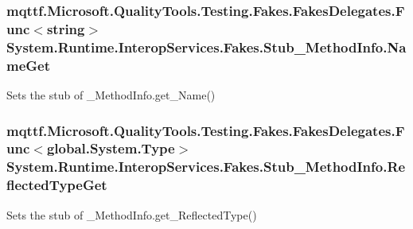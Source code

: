 \hypertarget{class_system_1_1_runtime_1_1_interop_services_1_1_fakes_1_1_stub___method_info_a2f80c227e0f981048a01eba08b0653f2}{
\subsubsection[{Name\-Get}]{\setlength{\rightskip}{0pt plus 5cm}mqttf.\-Microsoft.\-Quality\-Tools.\-Testing.\-Fakes.\-Fakes\-Delegates.\-Func$<$string$>$ System.\-Runtime.\-Interop\-Services.\-Fakes.\-Stub\-\_\-\-Method\-Info.\-Name\-Get}}\label{class_system_1_1_runtime_1_1_interop_services_1_1_fakes_1_1_stub___method_info_a2f80c227e0f981048a01eba08b0653f2}


Sets the stub of \-\_\-\-Method\-Info.\-get\-\_\-\-Name()

\hypertarget{class_system_1_1_runtime_1_1_interop_services_1_1_fakes_1_1_stub___method_info_aec8647cb4dccf19c4773077149a5662b}{
\subsubsection[{Reflected\-Type\-Get}]{\setlength{\rightskip}{0pt plus 5cm}mqttf.\-Microsoft.\-Quality\-Tools.\-Testing.\-Fakes.\-Fakes\-Delegates.\-Func$<$global.\-System.\-Type$>$ System.\-Runtime.\-Interop\-Services.\-Fakes.\-Stub\-\_\-\-Method\-Info.\-Reflected\-Type\-Get}}\label{class_system_1_1_runtime_1_1_interop_services_1_1_fakes_1_1_stub___method_info_aec8647cb4dccf19c4773077149a5662b}


Sets the stub of \-\_\-\-Method\-Info.\-get\-\_\-\-Reflected\-Type()

